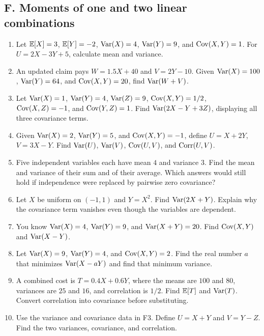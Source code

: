 \subsection{F. Moments of one and two linear combinations}
\begin{enumerate}[label=\textbf{F\arabic*.},leftmargin=*,itemsep=0.75em]
\item Let $\mathbb E[X]=3$, $\mathbb E[Y]=-2$, $\operatorname{Var}(X)=4$, $\operatorname{Var}(Y)=9$, and $\operatorname{Cov}(X,Y)=1$. For $U=2X-3Y+5$, calculate mean and variance.
\item An updated claim pays $W=1.5X+40$ and $V=2Y-10$. Given $\operatorname{Var}(X)=100$, $\operatorname{Var}(Y)=64$, and $\operatorname{Cov}(X,Y)=20$, find $\operatorname{Var}(W+V)$.
\item Let $\operatorname{Var}(X)=1$, $\operatorname{Var}(Y)=4$, $\operatorname{Var}(Z)=9$, $\operatorname{Cov}(X,Y)=1/2$, $\operatorname{Cov}(X,Z)=-1$, and $\operatorname{Cov}(Y,Z)=1$. Find $\operatorname{Var}(2X-Y+3Z)$, displaying all three covariance terms.
\item Given $\operatorname{Var}(X)=2$, $\operatorname{Var}(Y)=5$, and $\operatorname{Cov}(X,Y)=-1$, define $U=X+2Y$, $V=3X-Y$. Find $\operatorname{Var}(U)$, $\operatorname{Var}(V)$, $\operatorname{Cov}(U,V)$, and $\operatorname{Corr}(U,V)$.
\item Five independent variables each have mean $4$ and variance $3$. Find the mean and variance of their sum and of their average. Which answers would still hold if independence were replaced by pairwise zero covariance?
\item Let $X$ be uniform on $(-1,1)$ and $Y=X^2$. Find $\operatorname{Var}(2X+Y)$. Explain why the covariance term vanishes even though the variables are dependent.
\item You know $\operatorname{Var}(X)=4$, $\operatorname{Var}(Y)=9$, and $\operatorname{Var}(X+Y)=20$. Find $\operatorname{Cov}(X,Y)$ and $\operatorname{Var}(X-Y)$.
\item Let $\operatorname{Var}(X)=9$, $\operatorname{Var}(Y)=4$, and $\operatorname{Cov}(X,Y)=2$. Find the real number $a$ that minimizes $\operatorname{Var}(X-aY)$ and find that minimum variance.
\item A combined cost is $T=0.4X+0.6Y$, where the means are $100$ and $80$, variances are $25$ and $16$, and correlation is $1/2$. Find $\mathbb E[T]$ and $\operatorname{Var}(T)$. Convert correlation into covariance before substituting.
\item Use the variance and covariance data in F3. Define $U=X+Y$ and $V=Y-Z$. Find the two variances, covariance, and correlation.
\end{enumerate}

